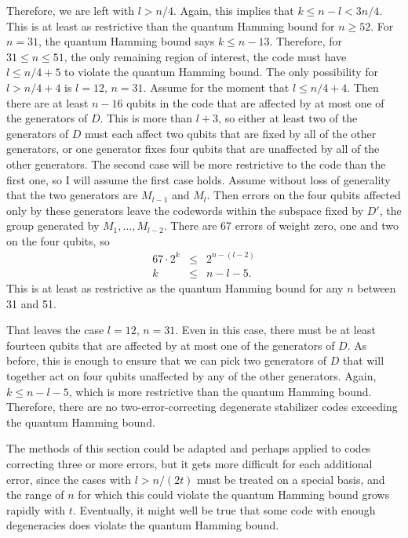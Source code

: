 Therefore, we are left with $l > n/4$.  Again, this implies that $k \leq n-l <
3n/4$.  This is at least as restrictive than the quantum Hamming bound for $n
\geq 52$.  For $n=31$, the quantum Hamming bound says $k \leq n-13$.
Therefore, for $31 \leq n \leq 51$, the only remaining region of interest,
the code must have $l \leq n/4 + 5$ to violate the quantum Hamming bound.
The only possibility for $l > n/4 + 4$ is $l=12$, $n=31$.  Assume for the
moment that $l \leq n/4 + 4$.  Then there are at least $n - 16$ qubits in
the code that are affected by at most one of the generators of $D$.  This is
more than $l+3$, so either at least two of the generators of $D$ must each
affect two qubits that are fixed by all of the other generators, or one generator fixes four qubits that are unaffected by all of the other generators.
The second case will be more restrictive to the code than the first one, so I
will assume the first case holds.  Assume without loss of generality that the
two generators are $M_{l-1}$ and $M_l$.  Then errors on the four qubits
affected only by these generators leave the codewords within the subspace fixed
by $D'$, the group generated by $M_1, \ldots, M_{l-2}$.  There are 67 errors of
weight zero, one and two on the four qubits, so
\begin{eqnarray}
	67 \cdot 2^k & \leq & 2^{n-(l-2)} \\
	k & \leq & n - l - 5.
\end{eqnarray}
This is at least as restrictive as the quantum Hamming bound for any $n$
between 31 and 51.

That leaves the case $l=12$, $n=31$.  Even in this case, there must be at
least fourteen qubits that are affected by at most one of the generators of
$D$.  As before, this is enough to ensure that we can pick two generators of
$D$ that will together act on four qubits unaffected by any of the other
generators.  Again, $k \leq n - l - 5$, which is more restrictive than the quantum Hamming bound.  Therefore, there are no two-error-correcting degenerate
stabilizer codes exceeding the quantum Hamming bound.

The methods of this section could be adapted and perhaps applied to codes
correcting three or more errors, but it gets more difficult for each
additional error, since the cases with $l > n/(2t)$ must be treated on a
special basis, and the range of $n$ for which this could violate the
quantum Hamming bound grows rapidly with $t$.  Eventually, it might
well be true that some code with enough degeneracies does violate the
quantum Hamming bound.

